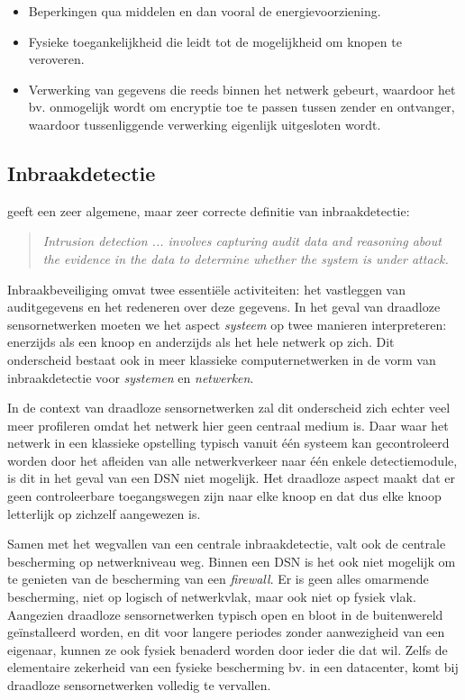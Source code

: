 \begin{itemize}[noitemsep, topsep=0pt, partopsep=0pt]

  \item{Beperkingen qua middelen en dan vooral de energievoorziening.}
  
  \item{Fysieke toegankelijkheid die leidt tot de mogelijkheid om knopen te
  veroveren.}

  \item{Verwerking van gegevens die reeds binnen het netwerk gebeurt, waardoor
  het bv. onmogelijk wordt om encryptie toe te passen tussen zender en
  ontvanger, waardoor tussenliggende verwerking eigenlijk uitgesloten wordt.}

\end{itemize}

\subsection{Inbraakdetectie}

\citep{zhang2000intrusion} geeft een zeer algemene, maar zeer correcte
definitie van inbraakdetectie:

\begin{quote}
\emph{Intrusion detection ... involves capturing audit data and reasoning about
the evidence in the data to determine whether the system is under attack.}
\end{quote}

Inbraakbeveiliging omvat twee essenti\"ele activiteiten: het vastleggen van
auditgegevens en het redeneren over deze gegevens. In het geval van draadloze
sensornetwerken moeten we het aspect \emph{systeem} op twee manieren
interpreteren: enerzijds als een knoop en anderzijds als het hele netwerk op
zich. Dit onderscheid bestaat ook in meer klassieke computernetwerken in de
vorm van inbraakdetectie voor \emph{systemen} en \emph{netwerken}.

In de context van draadloze sensornetwerken zal dit onderscheid zich echter
veel meer profileren omdat het netwerk hier geen centraal medium is. Daar waar
het netwerk in een klassieke opstelling typisch vanuit \'e\'en systeem kan
gecontroleerd worden door het afleiden van alle netwerkverkeer naar \'e\'en
enkele detectiemodule, is dit in het geval van een DSN niet mogelijk. Het
draadloze aspect maakt dat er geen controleerbare toegangswegen zijn naar elke
knoop en dat dus elke knoop letterlijk op zichzelf aangewezen is.

Samen met het wegvallen van een centrale inbraakdetectie, valt ook de centrale
bescherming op netwerkniveau weg. Binnen een DSN is het ook niet mogelijk om te
genieten van de bescherming van een \emph{firewall}. Er is geen alles omarmende
bescherming, niet op logisch of netwerkvlak, maar ook niet op fysiek vlak.
Aangezien draadloze sensornetwerken typisch open en bloot in de buitenwereld
ge\"installeerd worden, en dit voor langere periodes zonder aanwezigheid van
een eigenaar, kunnen ze ook fysiek benaderd worden door ieder die dat wil.
Zelfs de elementaire zekerheid van een fysieke bescherming bv. in een
datacenter, komt bij draadloze sensornetwerken volledig te vervallen.

